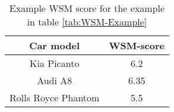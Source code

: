\begin{table}[ht]
    \centering
    \begin{tabular}{ |c|c| } 
        \hline
        \rowcolor{light-gray}
        Car model & WSM-score \\
        \hline
        Kia Picanto & 6.2 \\
        \hline
        Audi A8 & 6.35 \\
        \hline
        Rolls Royce Phantom & 5.5 \\
        \hline
    \end{tabular}
    \caption{Example WSM score for the example in table \ref{tab:WSM-Example}}
    \label{tab:WSM-score}
\end{table}
